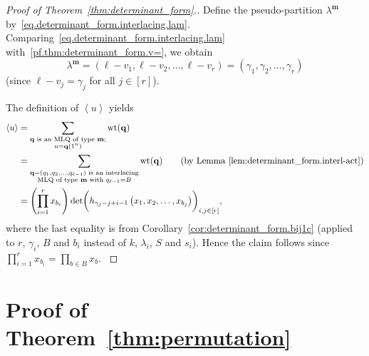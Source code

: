 \documentclass[reqno]{amsart}
\newcommand{\0}{\phantom{c}}
\newcommand{\swt}[1]{\left\langle #1 \right\rangle} %
\DeclareMathOperator{\wt}{wt} %
\newcommand{\mm}{\mathbf{m}}
\newcommand{\qq}{\mathbf{q}}
\let\sumnonlimits\sum
\let\prodnonlimits\prod
\renewcommand{\sum}{\sumnonlimits\limits}
\renewcommand{\prod}{\prodnonlimits\limits}
\newenvironment{verlong}{}{}
\newcommand{\tup}[1]{\left( #1 \right)}
\newcommand{\ive}[1]{\left[ #1 \right]}
\theoremstyle{plain}
\theoremstyle{definition}
\numberwithin{equation}{section}
\begin{document}
\begin{proof}[Proof of Theorem~\ref{thm:determinant_form}.]
Define the pseudo-partition $\lambda^{\mm}$ by~\eqref{eq.determinant_form.interlacing.lam}.
Comparing~\eqref{eq.determinant_form.interlacing.lam} with~\eqref{pf.thm:determinant_form.v=}, we obtain
\[
\lambda^{\mm} = \tup{\ell-v_1, \ell-v_2, \dotsc, \ell-v_r}
= \tup{\gamma_1, \gamma_2, \ldots, \gamma_r}
\]
(since $\ell - v_j = \gamma_j$ for all $j \in \ive{r}$).

The definition of $\swt{u}$ yields
\begin{align*}
\swt{u} & = \sum_{\substack{\qq \text{ is an MLQ of type } \mm; \\ u=\qq(1^n)}}\wt(\qq) \\
&  = \sum_{\substack{\qq = \tup{q_1, q_2, \dotsc, q_{\ell-1}} \text{ is an interlacing} \\\text{MLQ of type } \mm \text{ with } q_{\ell-1}=B}} \wt(\qq) \qquad \text{(by Lemma~\ref{lem:determinant_form.interl-act})} \\
&  = \left(  \prod_{i=1}^r x_{b_i} \right) \det\biggl( h_{\gamma_j-j+i-1}\left(x_1,x_2,\ldots,x_{b_j}\right)  \biggr)_{i, j \in \ive{r}} ,
\end{align*}
where the last equality is from Corollary~\ref{cor:determinant_form.bij1c} (applied to $r$, $\gamma_i$, $B$ and $b_i$ instead of $k$, $\lambda_i$, $S$ and $s_i$).
\begin{verlong}
Hence the claim follows since $\prod_{i=1}^r x_{b_i} = \prod_{b \in B} x_b$.
\end{verlong}
\end{proof}












\section{Proof of Theorem~\ref{thm:permutation}}
\label{sec:thm_proof}
\end{document}
